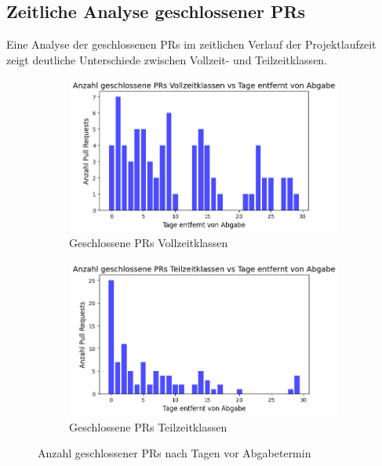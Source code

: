 \pagebreak

\subsection{Zeitliche Analyse geschlossener PRs}

Eine Analyse der geschlossenen PRs im zeitlichen Verlauf der Projektlaufzeit zeigt deutliche Unterschiede zwischen Vollzeit- und Teilzeitklassen.

\begin{figure}[htbp] 
\centering \begin{subfigure}[b]{0.48\textwidth} 
\centering \includegraphics[width=\textwidth]{Figures/closed-prs-projektzeit-vollzeit.png} 
\caption{Geschlossene PRs Vollzeitklassen} 
\label{fig:closed-prs-projektkeit-vollzeit}
\end{subfigure} 
\hfill 
\begin{subfigure}[b]{0.48\textwidth} 
\centering \includegraphics[width=\textwidth]{Figures/closed-prs-projektzeit-teilzeit.png} 
\caption{Geschlossene PRs Teilzeitklassen} 
\label{fig:closed-prs-projektkeit-teilzeit} 
\end{subfigure} 
\caption{Anzahl geschlossener PRs nach Tagen vor Abgabetermin} 
\label{fig:closed-prs-projektzeit} 
\end{figure}

